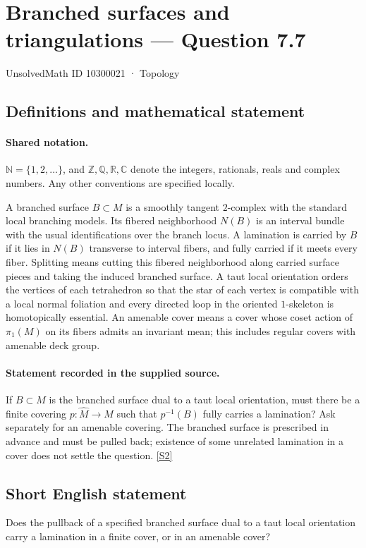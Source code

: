 \documentclass[11pt]{article}
\newcommand{\sref}[2]{\hyperlink{source:#1:#2}{[S#2]}}
\begin{document}
\setcounter{section}{10300020}
\section{Branched surfaces and triangulations — Question 7.7}\label{10300021}
{\small\sffamily UnsolvedMath ID 10300021 · Topology}
\subsection{Definitions and mathematical statement}

\paragraph{Shared notation.}$\mathbb N=\{1,2,\ldots\}$, and $\mathbb Z,\mathbb Q,\mathbb R,\mathbb C$ denote the integers, rationals, reals and complex numbers. Any other conventions are specified locally.


A branched surface $B\subset M$ is a smoothly tangent $2$-complex with the standard local branching models. Its fibered neighborhood $N(B)$ is an interval bundle with the usual identifications over the branch locus. A lamination is carried by $B$ if it lies in $N(B)$ transverse to interval fibers, and fully carried if it meets every fiber. Splitting means cutting this fibered neighborhood along carried surface pieces and taking the induced branched surface. A taut local orientation orders the vertices of each tetrahedron so that the star of each vertex is compatible with a local normal foliation and every directed loop in the oriented $1$-skeleton is homotopically essential. An amenable cover means a cover whose coset action of $\pi_1(M)$ on its fibers admits an invariant mean; this includes regular covers with amenable deck group.
\paragraph{Statement recorded in the supplied source.}
If $B\subset M$ is the branched surface dual to a taut local orientation, must there be a finite covering $p:\widehat M\to M$ such that $p^{-1}(B)$ fully carries a lamination? Ask separately for an amenable covering. The branched surface is prescribed in advance and must be pulled back; existence of some unrelated lamination in a cover does not settle the question. \sref{10300021}{2}
\subsection{Short English statement}
Does the pullback of a specified branched surface dual to a taut local orientation carry a lamination in a finite cover, or in an amenable cover?
\end{document}
